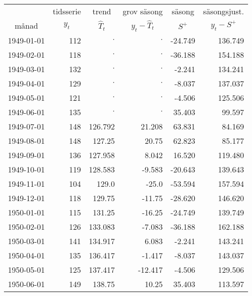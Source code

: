 \begin{tabular}{l|rrrrr}
\toprule 
  & \multicolumn{1}{c}{tidsserie} & \multicolumn{1}{c}{trend} & \multicolumn{1}{c}{grov säsong} & \multicolumn{1}{c}{säsong} & \multicolumn{1}{c}{säsongsjust.} \\
\multicolumn{1}{c}{månad} & \multicolumn{1}{c}{$y_t$} & \multicolumn{1}{c}{$ \hat{T}_t$} & \multicolumn{1}{c}{$ y_t - \hat{T}_t$} & \multicolumn{1}{c}{$ S^{+} $} & \multicolumn{1}{c}{$ y_t - S^{+} $} \\
\hline 
1949-01-01 & 112 & $ \cdot $ & $ \cdot $ & -24.749 & 136.749 \\
1949-02-01 & 118 & $ \cdot $ & $ \cdot $ & -36.188 & 154.188 \\
1949-03-01 & \cellcolor{lorange}132 & $ \cdot $ & $ \cdot $ & -2.241 & 134.241 \\
1949-04-01 & \cellcolor{lorange}129 & $ \cdot $ & $ \cdot $ & -8.037 & 137.037 \\
1949-05-01 & \cellcolor{lorange}121 & $ \cdot $ & $ \cdot $ & -4.506 & 125.506 \\
1949-06-01 & \cellcolor{lorange}135 & $ \cdot $ & $ \cdot $ & 35.403 & 99.597 \\
1949-07-01 & \cellcolor{lorange}148 & 126.792 & \cellcolor{lblue}21.208 & \cellcolor{blue}63.831 & 84.169 \\
1949-08-01 & \cellcolor{lorange}148 & 127.25 & 20.75 & 62.823 & 85.177 \\
1949-09-01 & \cellcolor{lorange}136 & \cellcolor{orange}127.958 & 8.042 & 16.520 & 119.480 \\
1949-10-01 & \cellcolor{lorange}119 & 128.583 & -9.583 & -20.643 & 139.643 \\
1949-11-01 & \cellcolor{lorange}104 & 129.0 & -25.0 & -53.594 & 157.594 \\
1949-12-01 & \cellcolor{lorange}118 & 129.75 & -11.75 & -28.620 & 146.620 \\
1950-01-01 & \cellcolor{lorange}115 & 131.25 & -16.25 & -24.749 & 139.749 \\
1950-02-01 & \cellcolor{lorange}126 & 133.083 & -7.083 & -36.188 & 162.188 \\
1950-03-01 & \cellcolor{lorange}141 & 134.917 & 6.083 & -2.241 & 143.241 \\
1950-04-01 & 135 & 136.417 & -1.417 & -8.037 & 143.037 \\
1950-05-01 & \cellcolor{lorange}125 & 137.417 & -12.417 & -4.506 & 129.506 \\
1950-06-01 & \cellcolor{lorange}149 & 138.75 & 10.25 & 35.403 & 113.597 \\

\end{tabular}
